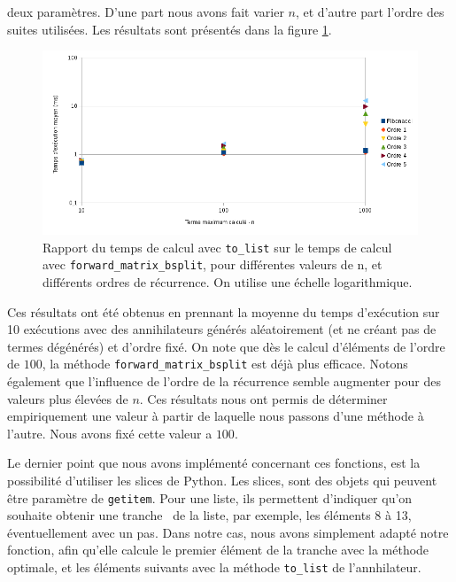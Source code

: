 \documentclass[12pt]{article}
\newlength{\charwidth}
\newcommand{\uline}{\underline{\hspace{2\charwidth}}}
\begin{document}
        deux paramètres. D'une part nous avons fait varier $n$, et d'autre part l'ordre des suites
        utilisées. Les résultats sont présentés dans la figure \ref{fig:getitem}.
        \begin{figure} \begin{center}
            \includegraphics[scale=0.7]{figures/graphe.png}
            \caption{\label{fig:getitem}Rapport du temps de calcul avec \texttt{to\_list} sur le temps
            de calcul avec \texttt{forward\_matrix\_bsplit}, pour différentes valeurs de n, et différents
            ordres de récurrence. On utilise une échelle logarithmique.}
        \end{center} \end{figure}
        Ces résultats ont été obtenus en prennant la moyenne du temps d'exécution sur 10 exécutions avec
        des annihilateurs générés aléatoirement (et ne créant pas de termes dégénérés) et d'ordre fixé.
        On note que dès le 
        calcul d'éléments de l'ordre de $100$, la méthode \texttt{forward\_matrix\_bsplit} est déjà plus
        efficace. Notons également que l'influence de l'ordre de la récurrence semble augmenter pour 
        des valeurs plus élevées de $n$. 
        Ces résultats nous ont permis de déterminer empiriquement
        une valeur à partir de laquelle nous passons d'une méthode à l'autre. Nous avons fixé cette valeur
        a $100$.\\
        \par Le dernier point que nous avons implémenté concernant ces fonctions,
        est la possibilité d'utiliser les slices de Python. Les slices, sont des objets
        qui peuvent être paramètre de \texttt{\uline getitem\uline}. Pour une liste, ils permettent
        d'indiquer qu'on souhaite obtenir une \og tranche \fg\ de la liste, par exemple, les éléments
        8 à 13, éventuellement avec un pas. Dans notre cas, nous avons simplement adapté notre
        fonction, afin qu'elle calcule le premier élément de la tranche avec la méthode optimale,
        et les éléments suivants avec la méthode \texttt{to\_list} de l'annhilateur.
\end{document}
